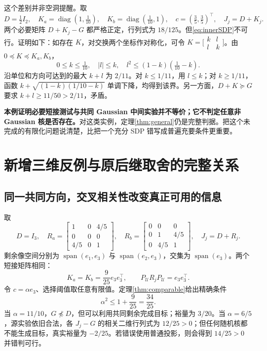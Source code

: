 \documentclass[UTF8,fontset=fandol,11pt,a4paper]{ctexart}
\DeclareMathOperator{\diag}{diag}\DeclareMathOperator{\tr}{tr}\DeclareMathOperator{\TV}{TV}
\theoremstyle{definition}\newtheorem{definition}[theorem]{定义}\newtheorem{assumption}[theorem]{条件}
\numberwithin{equation}{section}
\begin{document}
这个差别并非空洞提醒。取
\begin{equation}
D=\tfrac12I_2,\quad
K_a=\diag(1,\tfrac1{10}),\quad
K_b=\diag(\tfrac1{10},1),\quad c=(\tfrac35,\tfrac35)^\top,
\quad J_j=D+K_j.
\label{eq:gap}
\end{equation}
两个必要矩阵 $D+K_j-G$ 都严格正定，行列式为 $18/125$。但\eqref{eq:innerSDP}不可行。证明如下：如存在 $K$，对交换两个坐标作对称化，可令 $K=\bigl[\begin{smallmatrix}k&l\\l&k\end{smallmatrix}\bigr]$。由 $0\preceq K\preceq K_a,K_b$，
\[
0\le k\le\tfrac1{10},\quad |l|\le k,
\quad l^2\le(1-k)(\tfrac1{10}-k).
\]
沿单位和方向可达到的最大 $k+l$ 为 $2/11$。对 $k\le1/11$，用 $l\le k$；对 $k\ge1/11$，函数 $k+\sqrt{(1-k)(1/10-k)}$ 单调下降，均得到该界。另一方面，$D+K\succeq G$ 要求 $k+l\ge11/50>2/11$，矛盾。

\textbf{本例证明必要短接测试与共同 Gaussian 中间实验并不等价；它不判定任意非 Gaussian 核是否存在。}对这类实例，定理\ref{thm:general}仍是完整判据。把这个未完成的有限化问题说清楚，比把一个充分 SDP 错写成普遍充要条件更重要。

\section{新增三维反例与原后继取舍的完整关系}
\label{sec:examples}
\subsection{同一共同方向，交叉相关性改变真正可用的信息}
取
\begin{equation}
D=I_3,\quad R_a=\begin{bmatrix}1&0&4/5\\0&0&0\\4/5&0&1\end{bmatrix},\quad
R_b=\begin{bmatrix}0&0&0\\0&1&4/5\\0&4/5&1\end{bmatrix},\quad J_j=D+R_j.
\label{eq:threeD}
\end{equation}
剩余像空间分别为 $\operatorname{span}(e_1,e_3)$ 与 $\operatorname{span}(e_2,e_3)$，交集为 $\operatorname{span}(e_3)$。两个短接矩阵相同：
\begin{equation}
K_a=K_b=\frac9{25}e_3e_3^\top,
\qquad P_{\mathcal U}R_jP_{\mathcal U}=e_3e_3^\top.
\end{equation}
令 $c=\alpha e_3$、选择阈值取任意有限值。定理\ref{thm:comparable}给出精确条件
\begin{equation}
\boxed{\alpha^2\le1+\frac9{25}=\frac{34}{25}.}
\end{equation}
当 $\alpha=11/10$，$G\npreceq D$，但可以利用共同剩余完成目标；裕量为 $3/20$。当 $\alpha=6/5$，源实验依旧合法，各 $J_j-G$ 的相关二维行列式为 $12/25>0$；但任何随机核都不能生成目标，真实裕量为 $-2/25$。若错误使用普通投影，则会得到 $14/25>0$ 并错判可行。
\end{document}
